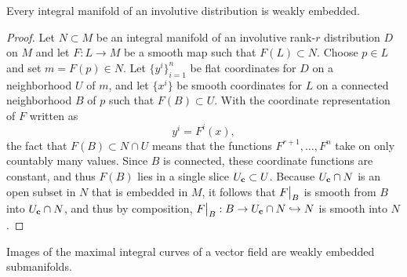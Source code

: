 \begin{thm}\label{thm 19.17 Lee}\label{prop 3.5.15 RS1}
    Every integral manifold of an involutive distribution is weakly embedded.
\end{thm}
\begin{proof}
    Let $N\subset M$ be an integral manifold of an involutive rank-$r$ distribution $D$ on $M$ and let $F:L\to M$ be a smooth map such that $F(L)\subset N$. Choose $p\in L$ and set $m=F(p)\in N$. Let $\{y^i\}_{i=1}^n$ be flat coordinates for $D$ on a neighborhood $U$ of $m$, and let $\{x^i\}$ be smooth coordinates for $L$ on a connected neighborhood $B$ of $p$ such that $F(B)\subset U$. With the coordinate representation of $F$ written as 
    \[y^i=F^i(x),\]
    the fact that $F(B)\subset N\cap U$ means that the functions $F^{r+1},\ldots, F^n$ take on only countably many values. Since $B$ is connected, these coordinate functions are constant, and thus $F(B)$ lies in a single slice $U_{\bf{c}}\subset U$. Because $U_{\bf{c}}\cap N$ is an open subset in $N$ that is embedded in $M$, it follows that $\restr{F}{B}$ is smooth from $B$ into $U_{\bf{c}}\cap N$, and thus by composition, $\restr{F}{B}:B\to U_{\bf{c}}\cap N\hookrightarrow N$ is smooth into $N$.
\end{proof}
\begin{cor}
    Images of the maximal integral curves of a vector field are weakly embedded submanifolds.
\end{cor}






